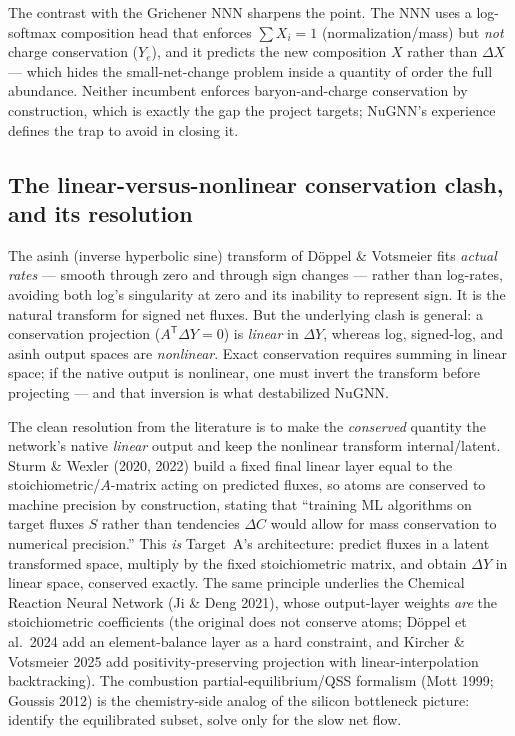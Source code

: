 \documentclass[11pt]{article}
\begin{document}
The contrast with the Grichener NNN sharpens the point. The NNN uses a log-softmax composition head that enforces $\sum X_i = 1$ (normalization/mass) but \emph{not} charge conservation ($Y_e$), and it predicts the new composition $X$ rather than $\Delta X$ --- which hides the small-net-change problem inside a quantity of order the full abundance. Neither incumbent enforces baryon-and-charge conservation by construction, which is exactly the gap the project targets; NuGNN's experience defines the trap to avoid in closing it.

\subsection{The linear-versus-nonlinear conservation clash, and its resolution}

The asinh (inverse hyperbolic sine) transform of D\"oppel \& Votsmeier fits \emph{actual rates} --- smooth through zero and through sign changes --- rather than log-rates, avoiding both log's singularity at zero and its inability to represent sign. It is the natural transform for signed net fluxes. But the underlying clash is general: a conservation projection ($A^{\mathsf{T}}\Delta Y = 0$) is \emph{linear} in $\Delta Y$, whereas log, signed-log, and asinh output spaces are \emph{nonlinear}. Exact conservation requires summing in linear space; if the native output is nonlinear, one must invert the transform before projecting --- and that inversion is what destabilized NuGNN.

The clean resolution from the literature is to make the \emph{conserved} quantity the network's native \emph{linear} output and keep the nonlinear transform internal/latent. Sturm \& Wexler (2020, 2022) build a fixed final linear layer equal to the stoichiometric/$A$-matrix acting on predicted fluxes, so atoms are conserved to machine precision by construction, stating that ``training ML algorithms on target fluxes $S$ rather than tendencies $\Delta C$ would allow for mass conservation to numerical precision.'' This \emph{is} Target~A's architecture: predict fluxes in a latent transformed space, multiply by the fixed stoichiometric matrix, and obtain $\Delta Y$ in linear space, conserved exactly. The same principle underlies the Chemical Reaction Neural Network (Ji \& Deng 2021), whose output-layer weights \emph{are} the stoichiometric coefficients (the original does not conserve atoms; D\"oppel et al.\ 2024 add an element-balance layer as a hard constraint, and Kircher \& Votsmeier 2025 add positivity-preserving projection with linear-interpolation backtracking). The combustion partial-equilibrium/QSS formalism (Mott 1999; Goussis 2012) is the chemistry-side analog of the silicon bottleneck picture: identify the equilibrated subset, solve only for the slow net flow.
\end{document}
